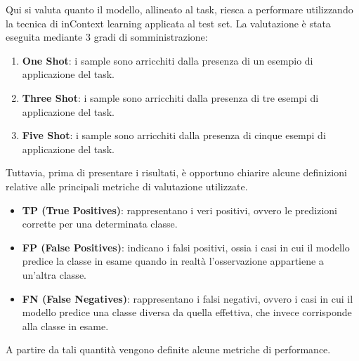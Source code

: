 \documentclass[a4paper,12pt]{article}
\begin{document}
Qui si valuta quanto il modello, allineato al task, riesca a performare utilizzando la tecnica di inContext learning applicata al test set. La valutazione è stata eseguita mediante 3 gradi di somministrazione:

\begin{enumerate}
    \item \textbf{One Shot}: i sample sono arricchiti dalla presenza di un esempio di applicazione del task.

    \item \textbf{Three Shot}: i sample sono arricchiti dalla presenza di tre esempi di applicazione del task.

    \item \textbf{Five Shot}: i sample sono arricchiti dalla presenza di cinque esempi di applicazione del task.
\end{enumerate}

Tuttavia, prima di presentare i risultati, è opportuno chiarire alcune definizioni relative alle principali metriche di valutazione utilizzate.

\begin{itemize}

    \item \textbf{TP (True Positives)}: rappresentano i veri positivi, ovvero le predizioni corrette per una determinata classe.

    \item \textbf{FP (False Positives)}: indicano i falsi positivi, ossia i casi in cui il modello predice la classe in esame quando in realtà l’osservazione appartiene a un’altra classe.

    \item \textbf{FN (False Negatives)}: rappresentano i falsi negativi, ovvero i casi in cui il modello predice una classe diversa da quella effettiva, che invece corrisponde alla classe in esame.

\end{itemize}

A partire da tali quantità vengono definite alcune metriche di performance.
\end{document}
